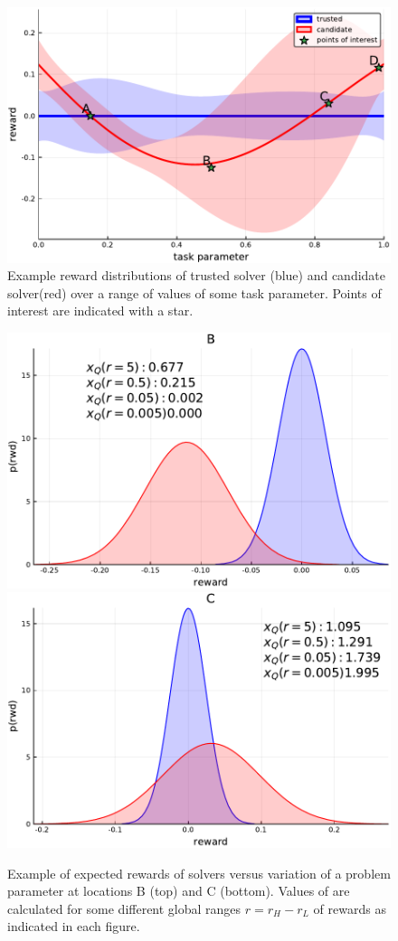 \begin{figure}[tbp]
    \centering
    \includegraphics[width=0.9\linewidth]{Figures/p1}
    \caption{Example reward distributions of trusted solver (blue) and candidate solver(red) over a range of values of some task parameter. Points of interest are indicated with a star.}
    \label{fig:sq_thry1}
\end{figure}
\begin{figure}[tbp]
    \centering
    \includegraphics[width=0.9\linewidth]{Figures/p3}\\
    \vspace{0.3cm}
    \includegraphics[width=0.9\linewidth]{Figures/p4}
    \caption{Example of expected rewards of solvers versus variation of a problem parameter at locations B (top) and C (bottom). Values of \xQ{} are calculated for some different global ranges $r=r_H-r_L$ of rewards as indicated in each figure.}
    \label{fig:sq_thry2}
\end{figure}
